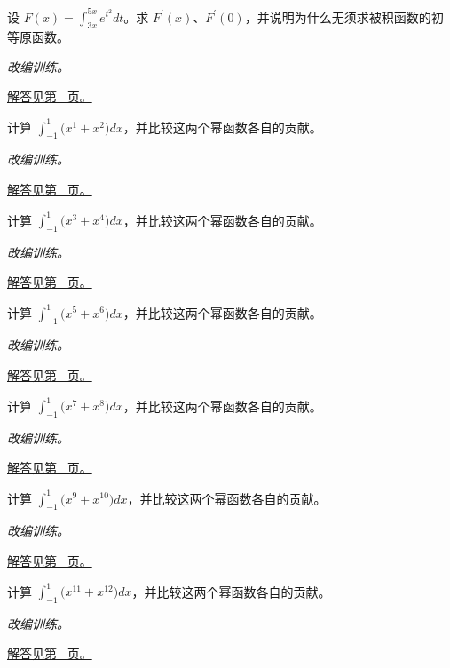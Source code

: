 \documentclass[12pt,fontset=fandol]{ctexart}
\begin{document}
\begin{example}[两个积分端点都在变化]\label{ex:c17q14}
设 $F(x)=\displaystyle\int_{3x}^{5x}e^{t^2}dt$。求 $F^{\prime}(x)$、$F^{\prime}(0)$，并说明为什么无须求被积函数的初等原函数。
\par\textit{改编训练。}\par\hyperref[ans:c17q14]{解答见第~\pageref{ans:c17q14} 页。}
\end{example}
\begin{example}[对称区间上的奇偶分解]\label{ex:c17q15}
计算 $\displaystyle\int_{-1}^1\bigl(x^{1}+x^{2}\bigr)dx$，并比较这两个幂函数各自的贡献。
\par\textit{改编训练。}\par\hyperref[ans:c17q15]{解答见第~\pageref{ans:c17q15} 页。}
\end{example}
\begin{example}[对称区间上的奇偶分解]\label{ex:c17q16}
计算 $\displaystyle\int_{-1}^1\bigl(x^{3}+x^{4}\bigr)dx$，并比较这两个幂函数各自的贡献。
\par\textit{改编训练。}\par\hyperref[ans:c17q16]{解答见第~\pageref{ans:c17q16} 页。}
\end{example}
\begin{example}[对称区间上的奇偶分解]\label{ex:c17q17}
计算 $\displaystyle\int_{-1}^1\bigl(x^{5}+x^{6}\bigr)dx$，并比较这两个幂函数各自的贡献。
\par\textit{改编训练。}\par\hyperref[ans:c17q17]{解答见第~\pageref{ans:c17q17} 页。}
\end{example}
\begin{example}[对称区间上的奇偶分解]\label{ex:c17q18}
计算 $\displaystyle\int_{-1}^1\bigl(x^{7}+x^{8}\bigr)dx$，并比较这两个幂函数各自的贡献。
\par\textit{改编训练。}\par\hyperref[ans:c17q18]{解答见第~\pageref{ans:c17q18} 页。}
\end{example}
\begin{example}[对称区间上的奇偶分解]\label{ex:c17q19}
计算 $\displaystyle\int_{-1}^1\bigl(x^{9}+x^{10}\bigr)dx$，并比较这两个幂函数各自的贡献。
\par\textit{改编训练。}\par\hyperref[ans:c17q19]{解答见第~\pageref{ans:c17q19} 页。}
\end{example}
\begin{example}[对称区间上的奇偶分解]\label{ex:c17q20}
计算 $\displaystyle\int_{-1}^1\bigl(x^{11}+x^{12}\bigr)dx$，并比较这两个幂函数各自的贡献。
\par\textit{改编训练。}\par\hyperref[ans:c17q20]{解答见第~\pageref{ans:c17q20} 页。}
\end{example}
\end{document}
